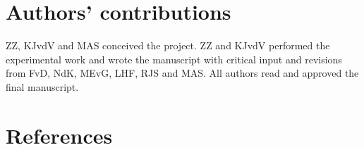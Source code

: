 \documentclass{book}
\begin{document}
\begin{refsection}
\section*{Authors' contributions}
ZZ, KJvdV and MAS conceived the project.
ZZ and KJvdV performed the experimental work and wrote the manuscript with critical input and revisions from FvD, NdK, MEvG, LHF, RJS and MAS.
All authors read and approved the final manuscript.

% 
% 


\section*{References}
\printbibliography[heading=none]

\clearpage

\end{refsection}
\end{document}
